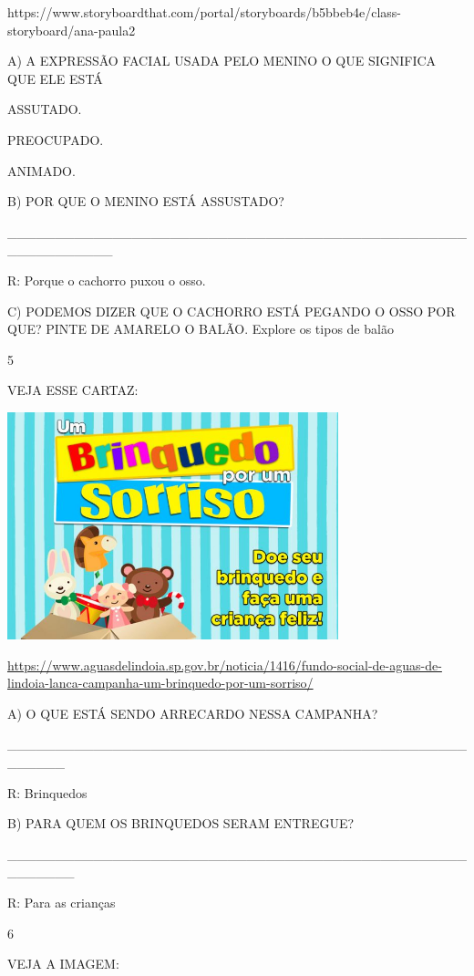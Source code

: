 {{https://www.storyboardthat.com/portal/storyboards/b5bbeb4e/class-storyboard/ana-paula2

A) A EXPRESSÃO FACIAL USADA PELO MENINO O QUE SIGNIFICA QUE ELE ESTÁ

ASSUTADO.

PREOCUPADO.

ANIMADO.

B) POR QUE O MENINO ESTÁ ASSUSTADO?

\_\_\_\_\_\_\_\_\_\_\_\_\_\_\_\_\_\_\_\_\_\_\_\_\_\_\_\_\_\_\_\_\_\_\_\_\_\_\_\_\_\_\_\_\_\_\_\_\_\_\_\_\_\_\_\_\_\_\_

R: Porque o cachorro puxou o osso.

C) PODEMOS DIZER QUE O CACHORRO ESTÁ PEGANDO O OSSO POR QUE? PINTE DE
AMARELO O BALÃO. Explore os tipos de balão

\num{5}

VEJA ESSE CARTAZ:

\includegraphics[width=3.78169in,height=2.59560in]{media/image132.jpeg}

\url{https://www.aguasdelindoia.sp.gov.br/noticia/1416/fundo-social-de-aguas-de-lindoia-lanca-campanha-um-brinquedo-por-um-sorriso/}

A) O QUE ESTÁ SENDO ARRECARDO NESSA CAMPANHA?

\_\_\_\_\_\_\_\_\_\_\_\_\_\_\_\_\_\_\_\_\_\_\_\_\_\_\_\_\_\_\_\_\_\_\_\_\_\_\_\_\_\_\_\_\_\_\_\_\_\_\_\_\_\_

R: Brinquedos

B) PARA QUEM OS BRINQUEDOS SERAM ENTREGUE?

\_\_\_\_\_\_\_\_\_\_\_\_\_\_\_\_\_\_\_\_\_\_\_\_\_\_\_\_\_\_\_\_\_\_\_\_\_\_\_\_\_\_\_\_\_\_\_\_\_\_\_\_\_\_\_

R: Para as crianças

\num{6}

VEJA A IMAGEM:

}}
